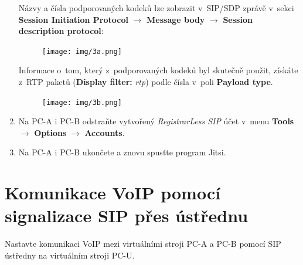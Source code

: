 \begin{enumerate}
Názvy a čísla podporovaných kodeků lze zobrazit v SIP/SDP zprávě v sekci {\bf Session Initiation Protocol} $\rightarrow$ {\bf Message body} $\rightarrow$ {\bf Session description protocol}:
\begin{figure}[H]
  \centering
  \texttt{[image: img/3a.png]}
\end{figure}

\noindent Informace o~tom, který z podporovaných kodeků byl skutečně použit, získáte z RTP paketů (\textbf{Display filter:} \emph{rtp}) podle čísla v poli {\bf Payload type}.
\begin{figure}[H]
  \centering
  \texttt{[image: img/3b.png]}
\end{figure}


    \item Na PC-A i PC-B odstraňte vytvořený {\it RegistrarLess SIP} účet v~menu {\bf Tools} $\rightarrow$ {\bf Options} $\rightarrow$ {\bf Accounts}.
    \item Na PC-A i PC-B ukončete a znovu spusťte program Jitsi.
\end{enumerate}

\section{Komunikace VoIP pomocí signalizace SIP přes ústřednu}
Nastavte komunikaci VoIP mezi virtuálními stroji PC-A a PC-B pomocí SIP ústředny na virtuálním stroji PC-U.

